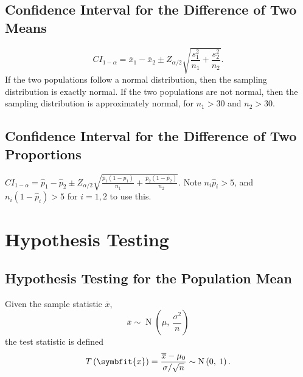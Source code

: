 \documentclass{article}
\begin{document}
\begin{multicols}{3}
\subsection{Confidence Interval for the Difference of Two Means}
\begin{equation*}
    {CI}_{1-\alpha} = \overline{x}_1 - \overline{x}_2 \pm Z_{\alpha/2} \sqrt{\frac{s_1^2}{n_1} + \frac{s_2^2}{n_2}}.
\end{equation*}
If the two populations follow a normal distribution, then the sampling distribution is exactly normal.
If the two populations are not normal, then the sampling distribution is approximately normal, for \(n_1 > 30\) and \(n_2 > 30\).
\subsection{Confidence Interval for the Difference of Two Proportions}
\(
    {CI}_{1-\alpha} = \hat{p}_1 - \hat{p}_2 \pm Z_{\alpha/2} \sqrt{\frac{\hat{p}_1\left( 1 - \hat{p}_1 \right)}{n_1} + \frac{\hat{p}_2\left( 1 - \hat{p}_2 \right)}{n_2}}.
    \)
Note
\(n_i \hat{p}_i > 5\), and 
\(n_i \left( 1 - \hat{p}_i \right) > 5\) for \(i=1,2\)
to use this.
\section{Hypothesis Testing}
\subsection{Hypothesis Testing for the Population Mean}
Given the sample statistic \(\overline{x}\),
\begin{equation*}
    \overline{x} \sim \operatorname{N}\left( \mu,\: \frac{\sigma^2}{n} \right)
\end{equation*}
the test statistic is defined
\begin{equation*}
    T\left( \symbfit{x} \right) = \frac{\overline{x} - \mu_0}{\sigma/\sqrt{n}} \sim \operatorname{N}\left( 0,\: 1 \right).
\end{equation*}

\end{multicols}
\end{document}
